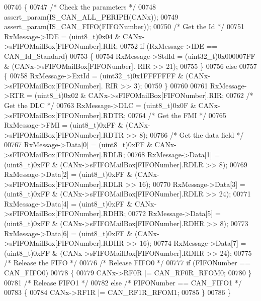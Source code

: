 \begin{DoxyCode}
00746 \{
00747   \textcolor{comment}{/* Check the parameters */}
00748   assert_param(IS_CAN_ALL_PERIPH(CANx));
00749   assert_param(IS_CAN_FIFO(FIFONumber));
00750   \textcolor{comment}{/* Get the Id */}
00751   RxMessage->IDE = (uint8\_t)0x04 & CANx->sFIFOMailBox[FIFONumber].RIR;
00752   if (RxMessage->IDE == CAN_Id_Standard)
00753   \{
00754     RxMessage->StdId = (uint32\_t)0x000007FF & (CANx->sFIFOMailBox[FIFONumber].
      RIR >> 21);
00755   \}
00756   \textcolor{keywordflow}{else}
00757   \{
00758     RxMessage->ExtId = (uint32\_t)0x1FFFFFFF & (CANx->sFIFOMailBox[FIFONumber].
      RIR >> 3);
00759   \}
00760   
00761   RxMessage->RTR = (uint8\_t)0x02 & CANx->sFIFOMailBox[FIFONumber].RIR;
00762   \textcolor{comment}{/* Get the DLC */}
00763   RxMessage->DLC = (uint8\_t)0x0F & CANx->sFIFOMailBox[FIFONumber].RDTR;
00764   \textcolor{comment}{/* Get the FMI */}
00765   RxMessage->FMI = (uint8\_t)0xFF & (CANx->sFIFOMailBox[FIFONumber].RDTR >> 8);
00766   \textcolor{comment}{/* Get the data field */}
00767   RxMessage->Data[0] = (uint8\_t)0xFF & CANx->sFIFOMailBox[FIFONumber].RDLR;
00768   RxMessage->Data[1] = (uint8\_t)0xFF & (CANx->sFIFOMailBox[FIFONumber].RDLR >> 8);
00769   RxMessage->Data[2] = (uint8\_t)0xFF & (CANx->sFIFOMailBox[FIFONumber].RDLR >> 16);
00770   RxMessage->Data[3] = (uint8\_t)0xFF & (CANx->sFIFOMailBox[FIFONumber].RDLR >> 24);
00771   RxMessage->Data[4] = (uint8\_t)0xFF & CANx->sFIFOMailBox[FIFONumber].RDHR;
00772   RxMessage->Data[5] = (uint8\_t)0xFF & (CANx->sFIFOMailBox[FIFONumber].RDHR >> 8);
00773   RxMessage->Data[6] = (uint8\_t)0xFF & (CANx->sFIFOMailBox[FIFONumber].RDHR >> 16);
00774   RxMessage->Data[7] = (uint8\_t)0xFF & (CANx->sFIFOMailBox[FIFONumber].RDHR >> 24);
00775   \textcolor{comment}{/* Release the FIFO */}
00776   \textcolor{comment}{/* Release FIFO0 */}
00777   \textcolor{keywordflow}{if} (FIFONumber == CAN_FIFO0)
00778   \{
00779     CANx->RF0R |= CAN_RF0R_RFOM0;
00780   \}
00781   \textcolor{comment}{/* Release FIFO1 */}
00782   \textcolor{keywordflow}{else} \textcolor{comment}{/* FIFONumber == CAN\_FIFO1 */}
00783   \{
00784     CANx->RF1R |= CAN_RF1R_RFOM1;
00785   \}
00786 \}
\end{DoxyCode}

